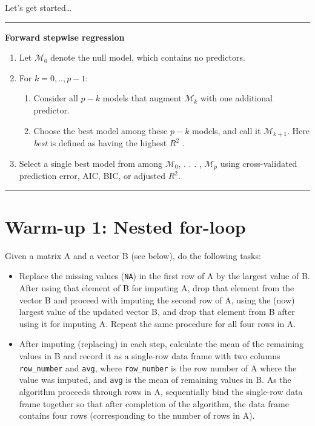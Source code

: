 \documentclass[
]{book}
\begin{document}
Let's get started\ldots{}

\begin{center}\rule{0.5\linewidth}{0.5pt}\end{center}

\textbf{Forward stepwise regression}

\begin{enumerate}
\def\labelenumi{\arabic{enumi}.}
\item
  Let \(\mathcal{M_0}\) denote the null model, which contains no predictors.
\item
  For \(k=0,..,p-1\):

  \begin{enumerate}
  \def\labelenumii{(\alph{enumii})}
  \item
    Consider all \(p − k\) models that augment \(\mathcal{M}_k\) with one additional predictor.
  \item
    Choose the best model among these \(p − k\) models, and call it \(\mathcal{M}_{k+1}\). Here \emph{best} is defined as having the highest \(R^2\) .
  \end{enumerate}
\item
  Select a single best model from among \(\mathcal{M}_0\), . . . , \(\mathcal{M}_p\) using cross-validated prediction error, AIC, BIC, or adjusted \(R^2\).
\end{enumerate}

\begin{center}\rule{0.5\linewidth}{0.5pt}\end{center}

\hypertarget{warm-up-1-nested-for-loop}{%
\section{Warm-up 1: Nested for-loop}\label{warm-up-1-nested-for-loop}}

Given a matrix A and a vector B (see below), do the following tasks:

\begin{itemize}
\item
  Replace the missing values (\texttt{NA}) in the first row of A by the largest value of B. After using that element of B for imputing A, drop that element from the vector B and proceed with imputing the second row of A, using the (now) largest value of the updated vector B, and drop that element from B after using it for imputing A. Repeat the same procedure for all four rows in A.
\item
  After imputing (replacing) in each step, calculate the mean of the remaining values in B and record it as a single-row data frame with two columns \texttt{row\_number} and \texttt{avg}, where \texttt{row\_number} is the row number of A where the value was imputed, and \texttt{avg} is the mean of remaining values in B. As the algorithm proceeds through rows in A, sequentially bind the single-row data frame together so that after completion of the algorithm, the data frame contains four rows (corresponding to the number of rows in A).
\end{itemize}
\end{document}
